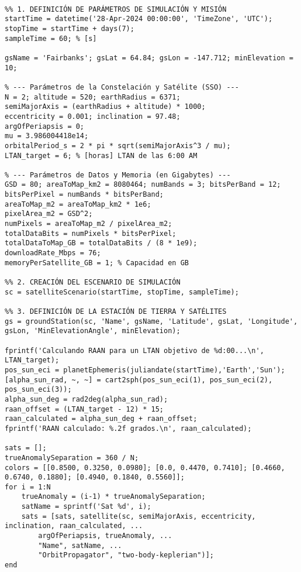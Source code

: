 \begin{verbatim}

%% 1. DEFINICIÓN DE PARÁMETROS DE SIMULACIÓN Y MISIÓN
startTime = datetime('28-Apr-2024 00:00:00', 'TimeZone', 'UTC');
stopTime = startTime + days(7);
sampleTime = 60; % [s]

gsName = 'Fairbanks'; gsLat = 64.84; gsLon = -147.712; minElevation = 10;

% --- Parámetros de la Constelación y Satélite (SSO) ---
N = 2; altitude = 520; earthRadius = 6371;
semiMajorAxis = (earthRadius + altitude) * 1000;
eccentricity = 0.001; inclination = 97.48;
argOfPeriapsis = 0;
mu = 3.986004418e14;
orbitalPeriod_s = 2 * pi * sqrt(semiMajorAxis^3 / mu);
LTAN_target = 6; % [horas] LTAN de las 6:00 AM

% --- Parámetros de Datos y Memoria (en Gigabytes) ---
GSD = 80; areaToMap_km2 = 8080464; numBands = 3; bitsPerBand = 12;
bitsPerPixel = numBands * bitsPerBand;
areaToMap_m2 = areaToMap_km2 * 1e6;
pixelArea_m2 = GSD^2;
numPixels = areaToMap_m2 / pixelArea_m2;
totalDataBits = numPixels * bitsPerPixel;
totalDataToMap_GB = totalDataBits / (8 * 1e9); 
downloadRate_Mbps = 76;
memoryPerSatellite_GB = 1; % Capacidad en GB

%% 2. CREACIÓN DEL ESCENARIO DE SIMULACIÓN
sc = satelliteScenario(startTime, stopTime, sampleTime);

%% 3. DEFINICIÓN DE LA ESTACIÓN DE TIERRA Y SATÉLITES
gs = groundStation(sc, 'Name', gsName, 'Latitude', gsLat, 'Longitude', gsLon, 'MinElevationAngle', minElevation);

fprintf('Calculando RAAN para un LTAN objetivo de %d:00...\n', LTAN_target);
pos_sun_eci = planetEphemeris(juliandate(startTime),'Earth','Sun');
[alpha_sun_rad, ~, ~] = cart2sph(pos_sun_eci(1), pos_sun_eci(2), pos_sun_eci(3));
alpha_sun_deg = rad2deg(alpha_sun_rad);
raan_offset = (LTAN_target - 12) * 15;
raan_calculated = alpha_sun_deg + raan_offset;
fprintf('RAAN calculado: %.2f grados.\n', raan_calculated);

sats = [];
trueAnomalySeparation = 360 / N;
colors = [[0.8500, 0.3250, 0.0980]; [0.0, 0.4470, 0.7410]; [0.4660, 0.6740, 0.1880]; [0.4940, 0.1840, 0.5560]];
for i = 1:N
    trueAnomaly = (i-1) * trueAnomalySeparation;
    satName = sprintf('Sat %d', i);
    sats = [sats, satellite(sc, semiMajorAxis, eccentricity, inclination, raan_calculated, ...
        argOfPeriapsis, trueAnomaly, ...
        "Name", satName, ...
        "OrbitPropagator", "two-body-keplerian")];
end


\end{verbatim}
